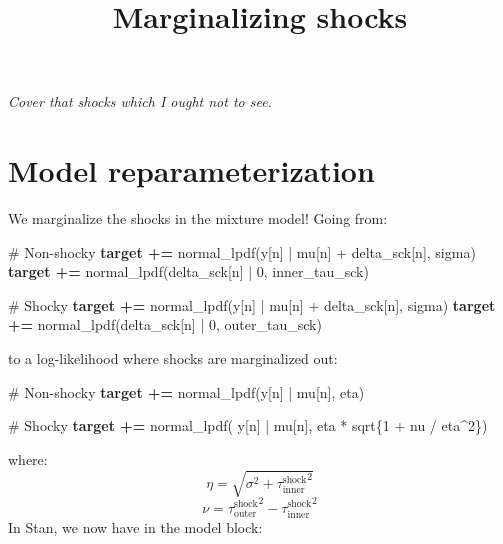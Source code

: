 \documentclass[
  letterpaper,
  DIV=11,
  numbers=noendperiod]{scrartcl}
\title{Marginalizing shocks}
\author{}
\date{}
\newenvironment{Shaded}{\begin{snugshade}}{\end{snugshade}}
\newcommand{\CommentTok}[1]{\textcolor[rgb]{0.37,0.37,0.37}{#1}}
\newcommand{\DecValTok}[1]{\textcolor[rgb]{0.68,0.00,0.00}{#1}}
\newcommand{\KeywordTok}[1]{\textcolor[rgb]{0.00,0.23,0.31}{\textbf{#1}}}
\newcommand{\NormalTok}[1]{\textcolor[rgb]{0.00,0.23,0.31}{#1}}
\renewcommand*\contentsname{Table of contents}
\newcommand\contentsname{Table of contents}
\begin{document}
\maketitle

\renewcommand*\contentsname{Table of contents}
{
\hypersetup{linkcolor=}
\setcounter{tocdepth}{3}
\tableofcontents
}

\emph{Cover that shocks which I ought not to see.}

\linespread{0.5}

\linespread{2}

\section{Model reparameterization}\label{model-reparameterization}

We marginalize the shocks in the mixture model! Going from:

\linespread{0.5}

\begin{Shaded}
\begin{Highlighting}[]
\CommentTok{\# Non{-}shocky}
\KeywordTok{target +=}\NormalTok{ normal\_lpdf(y[n] | mu[n] + delta\_sck[n], sigma)}
\KeywordTok{target +=}\NormalTok{ normal\_lpdf(delta\_sck[n] | }\DecValTok{0}\NormalTok{, inner\_tau\_sck)}

\CommentTok{\# Shocky}
\KeywordTok{target +=}\NormalTok{ normal\_lpdf(y[n] | mu[n] + delta\_sck[n], sigma)}
\KeywordTok{target +=}\NormalTok{ normal\_lpdf(delta\_sck[n] | }\DecValTok{0}\NormalTok{, outer\_tau\_sck)}
\end{Highlighting}
\end{Shaded}

\linespread{2}

to a log-likelihood where shocks are marginalized out:

\linespread{0.5}

\begin{Shaded}
\begin{Highlighting}[]
\CommentTok{\# Non{-}shocky}
\KeywordTok{target +=}\NormalTok{ normal\_lpdf(y[n] | mu[n], eta)}

\CommentTok{\# Shocky}
\KeywordTok{target +=}\NormalTok{ normal\_lpdf( y[n] | mu[n], eta * sqrt\{}\DecValTok{1}\NormalTok{ + nu / eta\^{}}\DecValTok{2}\NormalTok{\})}
\end{Highlighting}
\end{Shaded}

\linespread{2}

where: \[\eta = \sqrt{ \sigma^2 + {\tau_\text{inner}^\text{shock}}^2 }\]
\[\nu = {\tau_\text{outer}^\text{shock}}^2-{\tau_\text{inner}^\text{shock}}^2\]
In Stan, we now have in the model block:
\end{document}
